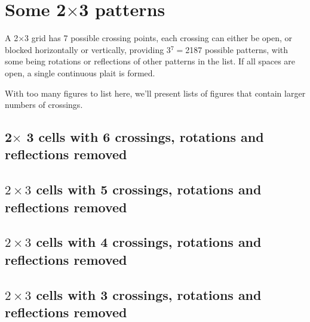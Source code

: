 \chapter{Some 2$\times$3 patterns}

A 2$\times$3 grid has 7 possible crossing points, each crossing can either be open, or blocked horizontally or vertically, providing 3$^{7}=$2187 possible patterns, with some being rotations or reflections of other patterns in the list. If all spaces are open, a single continuous plait is formed.
\begin{marginfigure}[-1.5cm]
\begin{center}
\scalebox{0.8}{

}
\end{center}
\end{marginfigure}
With too many figures to list here, we'll present lists of figures that contain larger numbers of crossings.

\section{2$\times$ 3 cells with 6 crossings, rotations and reflections removed}

%


\newpage
\section{$2\times 3$ cells with 5 crossings, rotations and reflections removed}
\scalebox{0.8}{
\begin{minipage}{15cm}

\end{minipage}
}
\newpage
\section{$2\times 3$ cells with 4 crossings, rotations and reflections removed}
\scalebox{0.6}{
\begin{minipage}{24cm}

\end{minipage}
}

\newpage

\section{$2\times 3$ cells with 3 crossings, rotations and reflections removed}
